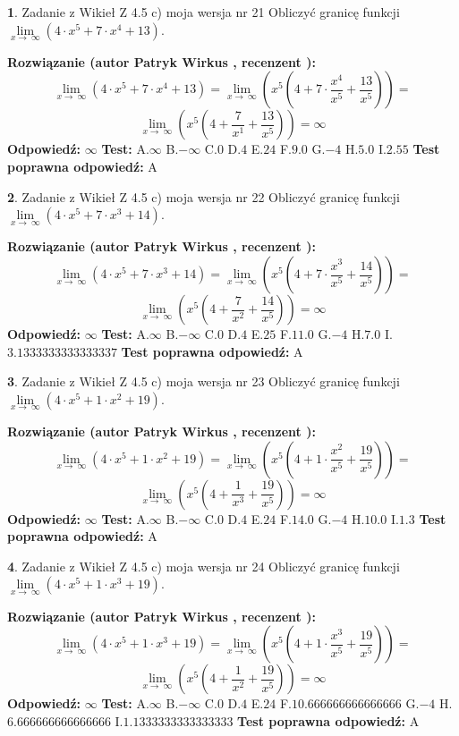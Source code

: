 \documentclass[12pt, a4paper]{article}
\theoremstyle{definition} %
\newtheorem{zad}{}
\newcommand{\zadStart}[1]{\begin{zad}#1\newline}
\newcommand{\zadStop}{\end{zad}}
\newcommand{\rozwStart}[2]{\noindent \textbf{Rozwiązanie (autor #1 , recenzent #2): }\newline}
\newcommand{\rozwStop}{\newline}
\newcommand{\odpStart}{\noindent \textbf{Odpowiedź:}\newline}
\newcommand{\odpStop}{\newline}
\newcommand{\testStart}{\noindent \textbf{Test:}\newline}
\newcommand{\testStop}{\newline}
\newcommand{\kluczStart}{\noindent \textbf{Test poprawna odpowiedź:}\newline}
\newcommand{\kluczStop}{\newline}
\begin{document}
\zadStart{Zadanie z Wikieł Z 4.5 c) moja wersja nr 21}
Obliczyć granicę funkcji  $\lim\limits_{x\to\ \infty}(4 \cdot x^{5}+7 \cdot x^{4}+13)$.
\zadStop
\rozwStart{Patryk Wirkus}{}
$$\lim\limits_{x\to\ \infty}(4 \cdot x^{5}+7 \cdot x^{4}+13) = \lim\limits_{x\to\ \infty}(x^{5}(4 +7 \cdot \frac{x^{4}}{x^{5}}+\frac{13}{x^{5}})) =$$ $$\lim\limits_{x\to\ \infty}(x^{5}(4 +\frac{7}{x^{1}}+\frac{13}{x^{5}})) =\infty$$
\rozwStop
\odpStart
$\infty$
\odpStop
\testStart
A.$\infty$ B.$-\infty$ C.$0$ D.$4$ E.$24$
F.$9.0$ G.$-4$
H.$5.0$
I.$2.55$
\testStop
\kluczStart
A
\kluczStop



\zadStart{Zadanie z Wikieł Z 4.5 c) moja wersja nr 22}
Obliczyć granicę funkcji  $\lim\limits_{x\to\ \infty}(4 \cdot x^{5}+7 \cdot x^{3}+14)$.
\zadStop
\rozwStart{Patryk Wirkus}{}
$$\lim\limits_{x\to\ \infty}(4 \cdot x^{5}+7 \cdot x^{3}+14) = \lim\limits_{x\to\ \infty}(x^{5}(4 +7 \cdot \frac{x^{3}}{x^{5}}+\frac{14}{x^{5}})) =$$ $$\lim\limits_{x\to\ \infty}(x^{5}(4 +\frac{7}{x^{2}}+\frac{14}{x^{5}})) =\infty$$
\rozwStop
\odpStart
$\infty$
\odpStop
\testStart
A.$\infty$ B.$-\infty$ C.$0$ D.$4$ E.$25$
F.$11.0$ G.$-4$
H.$7.0$
I.$3.1333333333333337$
\testStop
\kluczStart
A
\kluczStop



\zadStart{Zadanie z Wikieł Z 4.5 c) moja wersja nr 23}
Obliczyć granicę funkcji  $\lim\limits_{x\to\ \infty}(4 \cdot x^{5}+1 \cdot x^{2}+19)$.
\zadStop
\rozwStart{Patryk Wirkus}{}
$$\lim\limits_{x\to\ \infty}(4 \cdot x^{5}+1 \cdot x^{2}+19) = \lim\limits_{x\to\ \infty}(x^{5}(4 +1 \cdot \frac{x^{2}}{x^{5}}+\frac{19}{x^{5}})) =$$ $$\lim\limits_{x\to\ \infty}(x^{5}(4 +\frac{1}{x^{3}}+\frac{19}{x^{5}})) =\infty$$
\rozwStop
\odpStart
$\infty$
\odpStop
\testStart
A.$\infty$ B.$-\infty$ C.$0$ D.$4$ E.$24$
F.$14.0$ G.$-4$
H.$10.0$
I.$1.3$
\testStop
\kluczStart
A
\kluczStop



\zadStart{Zadanie z Wikieł Z 4.5 c) moja wersja nr 24}
Obliczyć granicę funkcji  $\lim\limits_{x\to\ \infty}(4 \cdot x^{5}+1 \cdot x^{3}+19)$.
\zadStop
\rozwStart{Patryk Wirkus}{}
$$\lim\limits_{x\to\ \infty}(4 \cdot x^{5}+1 \cdot x^{3}+19) = \lim\limits_{x\to\ \infty}(x^{5}(4 +1 \cdot \frac{x^{3}}{x^{5}}+\frac{19}{x^{5}})) =$$ $$\lim\limits_{x\to\ \infty}(x^{5}(4 +\frac{1}{x^{2}}+\frac{19}{x^{5}})) =\infty$$
\rozwStop
\odpStart
$\infty$
\odpStop
\testStart
A.$\infty$ B.$-\infty$ C.$0$ D.$4$ E.$24$
F.$10.666666666666666$ G.$-4$
H.$6.666666666666666$
I.$1.1333333333333333$
\testStop
\kluczStart
A
\kluczStop
\end{document}
